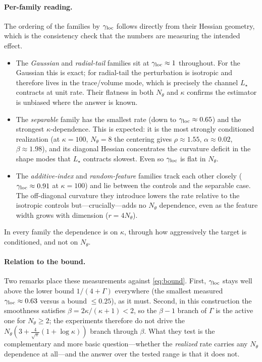 \documentclass[11pt]{article}
\begin{document}
\paragraph{Per-family reading.}
The ordering of the families by $\gamma_{\mathrm{loc}}$ follows directly from their Hessian
geometry, which is the consistency check that the numbers are measuring the
intended effect.
\begin{itemize}\itemsep3pt
  \item The \emph{Gaussian} and \emph{radial-tail} families sit at
  $\gamma_{\mathrm{loc}}\approx1$ throughout. For the Gaussian this is exact; for radial-tail the
  perturbation is isotropic and therefore lives in the trace/volume mode, which
  is precisely the channel $L_\star$ contracts at unit rate. Their flatness in
  both $N_\theta$ and $\kappa$ confirms the estimator is unbiased where the answer
  is known.
  \item The \emph{separable} family has the smallest rate (down to
  $\gamma_{\mathrm{loc}}\approx0.65$) and the strongest $\kappa$-dependence. This is expected: it
  is the most strongly conditioned realization (at $\kappa=100$, $N_\theta=8$ the
  centering gives $\rho\approx1.55$, $\alpha\approx0.02$, $\beta\approx1.98$), and
  its diagonal Hessian concentrates the curvature deficit in the shape modes that
  $L_\star$ contracts slowest. Even so $\gamma_{\mathrm{loc}}$ is flat in $N_\theta$.
  \item The \emph{additive-index} and \emph{random-feature} families track each
  other closely ($\gamma_{\mathrm{loc}}\approx0.91$ at $\kappa=100$) and lie between the controls
  and the separable case. The off-diagonal curvature they introduce lowers the
  rate relative to the isotropic controls but---crucially---adds no $N_\theta$
  dependence, even as the feature width grows with dimension ($r=4N_\theta$).
\end{itemize}
In every family the dependence is on $\kappa$, through how aggressively the
target is conditioned, and not on $N_\theta$.

\paragraph{Relation to the bound.}
Two remarks place these measurements against \eqref{eq:bound}. First, $\gamma_{\mathrm{loc}}$
stays well above the lower bound $1/(4+\Gamma)$ everywhere (the smallest measured
$\gamma_{\mathrm{loc}}\approx0.63$ versus a bound $\le0.25$), as it must. Second, in this
construction the smoothness satisfies $\beta=2\kappa/(\kappa+1)<2$, so the
$\beta-1$ branch of $\Gamma$ is the active one for $N_\theta\ge2$; the
experiments therefore do not drive the $N_\theta(3+\tfrac{4}{\sqrt\pi}(1+\log\kappa))$
branch through $\beta$. What they test is the complementary and more basic
question---whether the \emph{realized} rate carries any $N_\theta$ dependence at
all---and the answer over the tested range is that it does not.
\end{document}
